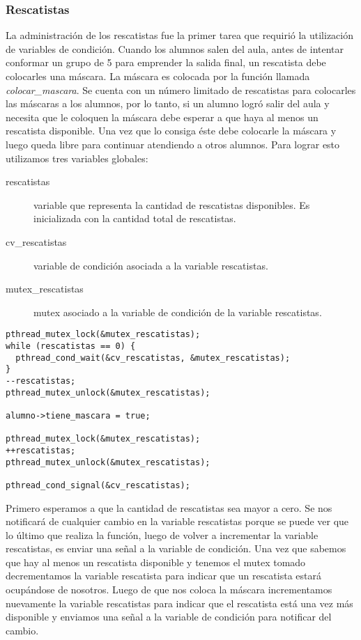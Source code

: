 \subsubsection{Rescatistas}
La administración de los rescatistas fue la primer tarea que requirió la utilización de 
variables de condición. Cuando los alumnos salen del aula, antes de intentar conformar
un grupo de 5 para emprender la salida final, un rescatista debe colocarles una máscara.
La máscara es colocada por la función llamada \textit{colocar\_mascara}. Se cuenta
con un número limitado de rescatistas para colocarles las máscaras a los alumnos, por
lo tanto, si un alumno logró salir del aula y necesita que le coloquen la máscara 
debe esperar a que haya al menos un rescatista disponible. Una vez que lo consiga
éste debe colocarle la máscara y luego queda libre para continuar atendiendo a otros
alumnos. Para lograr esto utilizamos tres variables globales:
\begin{description}
  \item[rescatistas] variable que representa la cantidad de rescatistas disponibles.
    Es inicializada con la cantidad total de rescatistas.
  \item[cv\_rescatistas] variable de condición asociada a la variable rescatistas.
  \item[mutex\_rescatistas] mutex asociado a la variable de condición de la variable
    rescatistas.
\end{description}

\begin{center}
\begin{minipage}{1.05\textwidth}
\begin{lstlisting}[frame=lrtb]
pthread_mutex_lock(&mutex_rescatistas);
while (rescatistas == 0) {
  pthread_cond_wait(&cv_rescatistas, &mutex_rescatistas);
}			
--rescatistas;
pthread_mutex_unlock(&mutex_rescatistas);

alumno->tiene_mascara = true;

pthread_mutex_lock(&mutex_rescatistas);
++rescatistas;
pthread_mutex_unlock(&mutex_rescatistas);

pthread_cond_signal(&cv_rescatistas);
\end{lstlisting}
\end{minipage}
\end{center}
Primero esperamos a que la cantidad de rescatistas sea mayor a cero. Se nos notificará
de cualquier cambio en la variable rescatistas porque se puede ver que lo último que
realiza la función, luego de volver a incrementar la variable rescatistas, es enviar
una señal a la variable de condición. Una vez que sabemos que hay al menos un rescatista
disponible y tenemos el mutex tomado decrementamos la variable rescatista para indicar
que un rescatista estará ocupándose de nosotros. Luego de que nos coloca la máscara
incrementamos nuevamente la variable rescatistas para indicar que el rescatista está
una vez más disponible y enviamos una señal a la variable de condición para notificar
del cambio.

